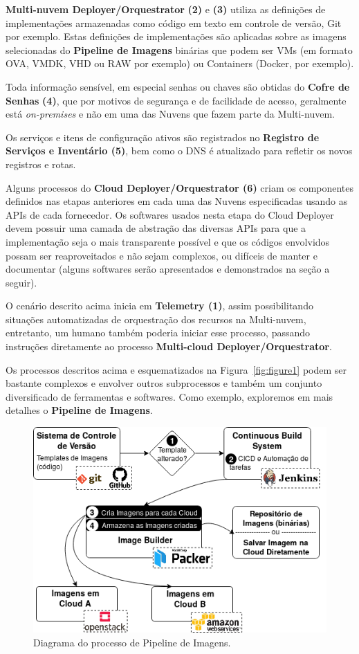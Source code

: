 \documentclass[12pt]{article}
\begin{document}
	\textbf{Multi-nuvem Deployer/Orquestrator} \textbf{(2)} e \textbf{(3)} utiliza as definições de implementações armazenadas como código em texto em controle de versão, Git por exemplo. Estas definições de implementações são aplicadas sobre as imagens selecionadas do \textbf{Pipeline de Imagens} binárias que podem ser VMs (em formato OVA, VMDK, VHD ou RAW por exemplo) ou Containers (Docker, por exemplo).
	
	Toda informação sensível, em especial senhas ou chaves são obtidas do \textbf{Cofre de Senhas} \textbf{(4)}, que por motivos de segurança e de facilidade de acesso, geralmente está \textit{on-premises} e não em uma das Nuvens que fazem parte da Multi-nuvem.   
	
	Os serviços e itens de configuração ativos são registrados no \textbf{Registro de Serviços e Inventário (5)}, bem como o DNS é atualizado para refletir os novos registros e rotas.
	
	Alguns processos do \textbf{Cloud Deployer/Orquestrator (6)} criam os componentes definidos nas etapas anteriores em cada uma das Nuvens especificadas usando as APIs de cada fornecedor. Os softwares usados nesta etapa do Cloud Deployer devem possuir uma camada de abstração das diversas APIs para que a implementação seja o mais transparente possível e que os códigos envolvidos possam ser reaproveitados e não sejam complexos, ou difíceis de manter e documentar (alguns softwares serão apresentados e demonstrados na seção a seguir).  

	O cenário descrito acima inicia em \textbf{Telemetry (1)}, assim possibilitando situações automatizadas de orquestração dos recursos na Multi-nuvem, entretanto, um humano também poderia iniciar esse processo, passando instruções diretamente ao processo \textbf{Multi-cloud Deployer/Orquestrator}.  
	
	Os processos descritos acima e esquematizados na Figura~\ref{fig:figure1} podem ser bastante complexos e envolver outros subprocessos e também um conjunto diversificado de ferramentas e softwares. Como exemplo, exploremos em mais detalhes o \textbf{Pipeline de Imagens}.
		
    \begin{figure}[ht]
    	\centering
    	\includegraphics[width=0.7\linewidth]{figuras/Figure2.png}
    	\caption{Diagrama do processo de Pipeline de Imagens.}
    	\label{fig:figure2}
    \end{figure}
    
\end{document}
